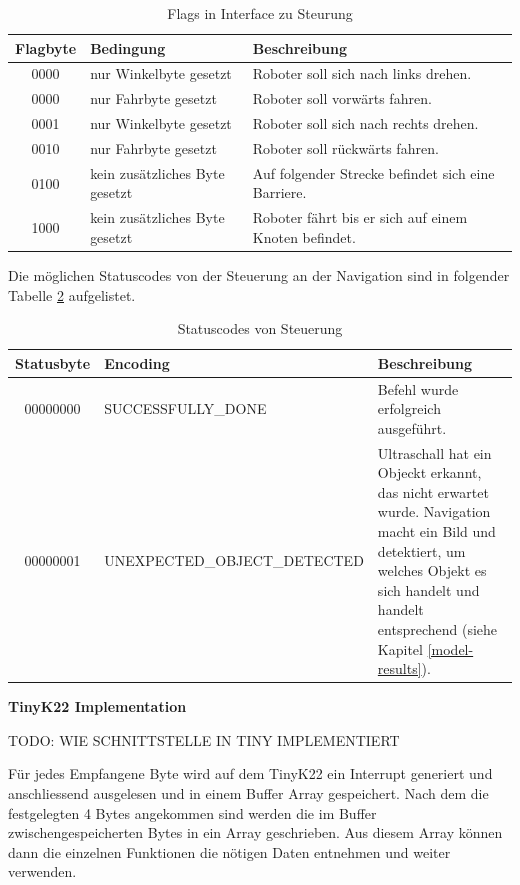 \begin{table}[H]
\centering
\small
\begin{tabularx}{\textwidth}{|c|X|X|}
\hline
  \textbf{Flagbyte} & \textbf{Bedingung} & \textbf{Beschreibung}\\
  \hline
      0000&nur Winkelbyte gesetzt&Roboter soll sich nach links drehen.\\
  \hline
        0000&nur Fahrbyte gesetzt&Roboter soll vorwärts fahren.\\
  \hline
0001&nur Winkelbyte gesetzt&Roboter soll sich nach rechts drehen.\\
  \hline

0010&nur Fahrbyte gesetzt&Roboter soll rückwärts fahren.\\
  \hline

0100&kein zusätzliches Byte gesetzt&Auf folgender Strecke befindet sich eine Barriere.\\
  \hline
1000&kein zusätzliches Byte gesetzt&Roboter fährt bis er sich auf einem Knoten befindet.\\
  \hline
  \end{tabularx}
\caption{Flags in Interface zu Steurung}
\label{table:flag-to-tiny}
\end{table}



Die möglichen Statuscodes von der Steuerung an der Navigation sind in folgender Tabelle \ref{table:statuscodes} aufgelistet.

\begin{table}[H]
\centering
\small
\begin{tabularx}{\textwidth}{|c|l|X|}
\hline
  \textbf{Statusbyte} & \textbf{Encoding} & \textbf{Beschreibung} \\
  \hline
      00000000&SUCCESSFULLY\_DONE&Befehl wurde erfolgreich ausgeführt. \\
  \hline
00000001&UNEXPECTED\_OBJECT\_DETECTED &Ultraschall hat ein Objeckt erkannt, das nicht erwartet wurde. Navigation macht ein Bild und detektiert, um welches Objekt es sich handelt und handelt entsprechend (siehe Kapitel \ref{model-results}).\\
  \hline
\end{tabularx}
\caption{Statuscodes von Steuerung}
\label{table:statuscodes}
\end{table}

\textbf{TinyK22 Implementation}

TODO: WIE SCHNITTSTELLE IN TINY IMPLEMENTIERT

Für jedes Empfangene Byte wird auf dem TinyK22 ein Interrupt generiert und anschliessend ausgelesen und in einem Buffer Array gespeichert. Nach dem die festgelegten 4 Bytes angekommen sind werden die im Buffer zwischengespeicherten Bytes in ein Array geschrieben. Aus diesem Array können dann die einzelnen Funktionen die nötigen Daten entnehmen und weiter verwenden.

